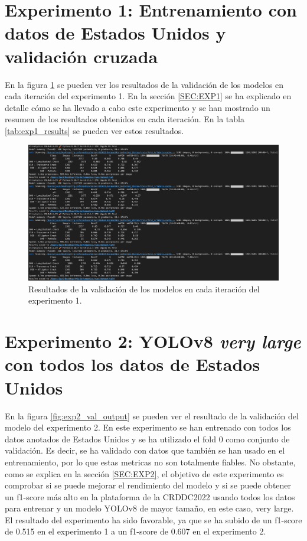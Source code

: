 
\section{Experimento 1: Entrenamiento con datos de Estados Unidos y validación cruzada}
En la figura \ref{fig:exp1_val_output} se pueden ver los resultados de la validación de los modelos en cada iteración del experimento 1. En la sección \ref{SEC:EXP1} se ha explicado en detalle cómo se ha llevado a cabo este experimento y se han mostrado un resumen de los resultados obtenidos en cada iteración. En la tabla \ref{tab:exp1_results} se pueden ver estos resultados.

\begin{figure}[H]
    \centering
    \includegraphics[width=\textwidth,height=\textheight,keepaspectratio]{../img/exp1-val-output.png}
    \caption{Resultados de la validación de los modelos en cada iteración del experimento 1.}
    \label{fig:exp1_val_output}
\end{figure}
\newpage

\section{Experimento 2: YOLOv8 \textit{very large} con todos los datos de Estados Unidos}
En la figura \ref{fig:exp2_val_output} se pueden ver el resultado de la validación del modelo del experimento 2. En este experimento se han entrenado con todos los datos anotados de Estados Unidos y se ha utilizado el fold 0 como conjunto de validación. Es decir, se ha validado con datos que también se han usado en el entrenamiento, por lo que estas metricas no son totalmente fiables. No obstante, como se explica en la sección \ref{SEC:EXP2}, el objetivo de este experimento es comprobar si se puede mejorar el rendimiento del modelo y si se puede obtener un f1-score más alto en la plataforma de la CRDDC2022 usando todos los datos para entrenar y un modelo YOLOv8 de mayor tamaño, en este caso, very large. El resultado del experimento ha sido favorable, ya que se ha subido de un f1-score de 0.515 en el experimento 1 a un f1-score de 0.607 en el experimento 2.

